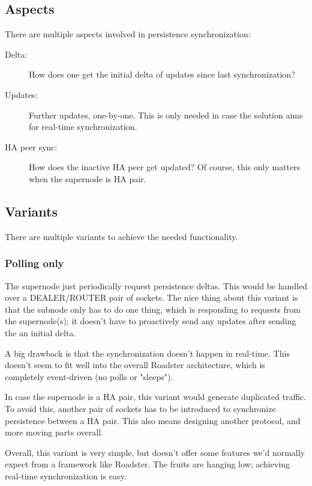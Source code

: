 \subsection{Aspects}

There are multiple aspects involved in persistence synchronization:

\begin{description}
	\item [Delta:]
		How does one get the initial delta of updates since last
		synchronization?

	\item [Updates:]
		Further updates, one-by-one. This is only needed in
		case the solution aims for real-time synchronization.

	\item [HA peer sync:]
		How does the inactive HA peer get updated? Of
		course, this only matters when the supernode is HA pair.
\end{description}

\subsection{Variants}

There are multiple variants to achieve the needed functionality.

\subsubsection{Polling only}
The supernode just periodically request persistence
deltas. This would be handled over a DEALER/ROUTER pair of sockets. The nice
thing about this variant is that the subnode only has to do one thing, which is
responding to requests from the supernode(s); it doesn't have to proactively
send any updates after sending the an initial delta.

A big drawback is that the synchronization doesn't happen in real-time. This
doesn't seem to fit well into the overall Roadster architecture, which is
completely event-driven (no polls or "sleeps").

In case the supernode is a HA pair, this variant would generate duplicated
traffic. To avoid this, another pair of sockets has to be introduced to
synchronize persistence between a HA pair. This also means designing another
protocol, and more moving parts overall.

Overall, this variant is very simple, but doesn't offer some features we'd
normally expect from a framework like Roadster. The fruits are hanging low;
achieving real-time synchronization is easy.

